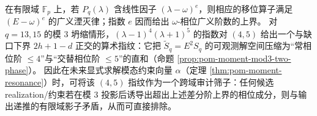 

\begin{remark}\label{rem:pom-modp-factor-exponent-fingerprint}
在有限域 \(\mathbb{F}_p\) 上，若 \(P_q(\lambda)\) 含线性因子 \((\lambda-\omega)^e\)，则相应的移位算子满足 \((E-\omega)^e\) 的广义湮灭律；指数 \(e\) 因而给出 \(\omega\)-相位广义阶数的上界。
对 \(q=13,15\) 的模 \(3\) 坍缩情形，\((\lambda-1)^4(\lambda+1)^5\) 的指数对 \((4,5)\) 给出一个与缺口下界 \(2h+1-d\) 正交的算术指纹：它把 \(\widetilde S_q=E^2S_q\) 的可观测解空间压缩为“常相位阶 \(\le 4\)”与“交替相位阶 \(\le 5\)”的直和（命题 \ref{prop:pom-moment-mod3-two-phase}）。
因此在未来显式求解模态约束向量 \(\alpha\)（定理 \ref{thm:pom-moment-resonance}）时，可将该 \((4,5)\) 指纹作为一个跨域审计筛子：任何候选 realization/约束若在模 \(3\) 投影后诱导出超出上述差分阶上界的相位成分，则与输出递推的有限域影子矛盾，从而可直接排除。
\end{remark}


